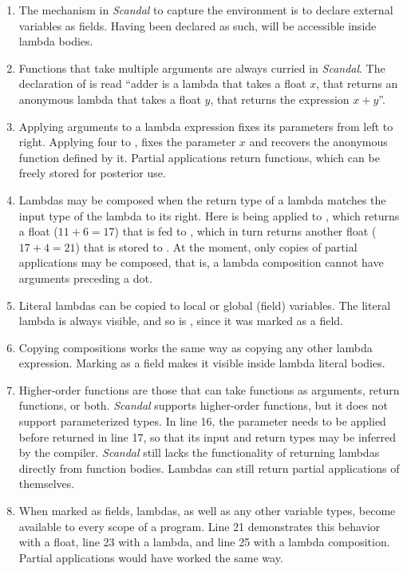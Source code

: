 \begin{enumerate}
	\item The mechanism in \emph{Scandal} to capture the environment is to declare external variables as fields. Having been declared as such,  will be accessible inside lambda bodies.
	\addtocounter{enumi}{1}
	\item Functions that take multiple arguments are always curried in \emph{Scandal}. The declaration of  is read ``adder is a lambda that takes a float $x$, that returns an anonymous lambda that takes a float $y$, that returns the expression $x + y$''.
	\item Applying arguments to a lambda expression fixes its parameters from left to right. Applying four to , fixes the parameter $x$ and recovers the anonymous function defined by it. Partial applications return functions, which can be freely stored for posterior use.
	\addtocounter{enumi}{1}
	\item Lambdas may be composed when the return type of a lambda matches the input type of the lambda to its right. Here  is being applied to , which returns a float ($11 + 6 = 17$) that is fed to , which in turn returns another float ($17 + 4 = 21$) that is stored to . At the moment, only copies of partial applications may be composed, that is, a lambda composition cannot have arguments preceding a dot.
	\addtocounter{enumi}{1}
	\item Literal lambdas can be copied to local or global (field) variables. The literal lambda  is always visible, and so is , since it was marked as a field.
	\addtocounter{enumi}{3}
	\item Copying compositions works the same way as copying any other lambda expression. Marking  as a field makes it visible inside lambda literal bodies.
	\addtocounter{enumi}{2}
	\item Higher-order functions are those that can take functions as arguments, return functions, or both. \emph{Scandal} supports higher-order functions, but it does not support parameterized types. In line 16, the parameter  needs to be applied before returned in line 17, so that its input and return types may be inferred by the compiler. \emph{Scandal} still lacks the functionality of returning lambdas directly from function bodies. Lambdas can still return partial applications of themselves.
	\addtocounter{enumi}{5}
	\item When marked as fields, lambdas, as well as any other variable types, become available to every scope of a program. Line 21 demonstrates this behavior with a float, line 23 with a lambda, and line 25 with a lambda composition. Partial applications would have worked the same way.
\end{enumerate}


